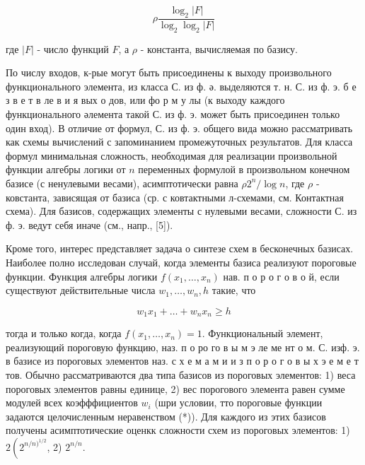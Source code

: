 \documentclass[10pt]{article}
\begin{document}
\[

\rho \frac{\log _{2}|F|}{\log _{2} \log _{2}|F|}

\]



где $|F|$ - число функций $F$, а $\rho$ - константа, вычисляемая по базису.



По числу входов, к-рые могут быть присоединены к выходу произвольного функционального элемента, из класса С. из ф. ә. выделяются т. н. С. из ф. э. б е з в е т в ле в и я вых о дов, или фо р м у лы (к выходу каждого функционального әлемента такой С. из ф. э. может быть присоединен только один вход). В отличие от формул, С. из ф. э. общего вида можно рассматривать как схемы вычислений с запоминанием промежуточных результатов. Для класса формул минимальная сложность, необходимая для реализации произвольной функции алгебры логики от $n$ переменных формулой в произвольном конечном базисе (с ненулевыми весами), асимптотически равна $\rho 2^{n} / \log n$, где $\rho$ - ковстанта, зависящая от базиса (ср. с ковтактными л-схемами, см. Контактная схема). Для базисов, содержащих элементы с нулевыми весами, сложности С. из ф. э. ведут себя иначе (см., напр., [5]).



Кроме того, интерес представляет задача о синтезе схем в бесконечных базисах. Наиболее полно исследован случай, когда элементы базиса реализуют пороговые функции. Функция алгебры логики $f\left(x_{1}, \ldots, x_{n}\right)$ нав. п о р о г о в о й, если существуют действительные числа $w_{1}, \ldots, w_{n}, h$ такие, что



\[

w_{1} x_{1}+\ldots+w_{n} x_{n} \geqslant h

\]



тогда и только когда, когда $f\left(x_{1}, \ldots, x_{n}\right)=1$. Функциональный элемент, реализующий пороговую функцию, наз. п о ро го в ы м э ле ме нт о м. С. изф. э. в базисе из пороговых элементов наз. с х е м а м и и з п о р о г о в ы х э е м е т тов. Обычно рассматриваются два типа базисов из пороговых элементов: 1) веса пороговых элементов равны единице, 2) вес порогового элемента равен сумме модулей всех коэфффициентов $w_{i}$ (шри условии, тто пороговые функции задаются целочисленным неравенством (*)). Для каждого из этих базисов получены асимптотические оценкк сложности схем из пороговых элементов: 1) $2\left(2^{n / n)^{1 / 2}}\right.$, 2) $2^{n / n}$.
\end{document}
